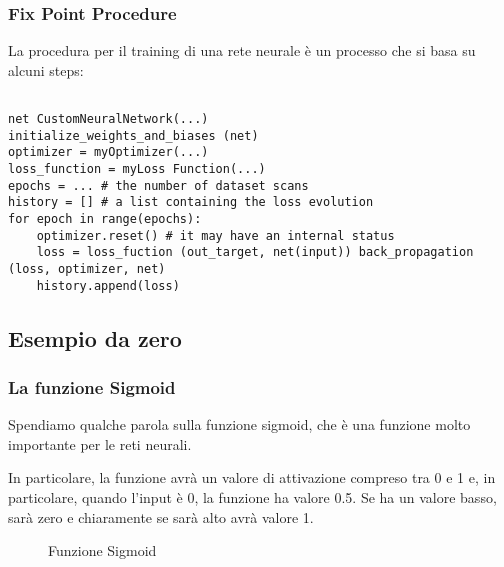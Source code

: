 \subsubsection{Fix Point Procedure}

La procedura per il training di una rete neurale è un processo che si basa su
alcuni steps:
\begin{lstlisting}

net CustomNeuralNetwork(...)
initialize_weights_and_biases (net)
optimizer = myOptimizer(...) 
loss_function = myLoss Function(...)
epochs = ... # the number of dataset scans
history = [] # a list containing the loss evolution
for epoch in range(epochs):
    optimizer.reset() # it may have an internal status
    loss = loss_fuction (out_target, net(input)) back_propagation (loss, optimizer, net)
    history.append(loss)
\end{lstlisting}

\subsection{Esempio da zero}
\subsubsection{La funzione Sigmoid}

Spendiamo qualche parola sulla funzione sigmoid, che è una funzione molto
importante per le reti neurali.

In particolare, la funzione avrà un valore di attivazione compreso tra 0 e 1 e,
in particolare, quando l'input è 0, la funzione ha valore 0.5. Se ha un valore
basso, sarà zero e chiaramente se sarà alto avrà valore 1.
\begin{figure}[H]
    \begin{center}
    \end{center}
    \caption{Funzione Sigmoid}
\end{figure}

